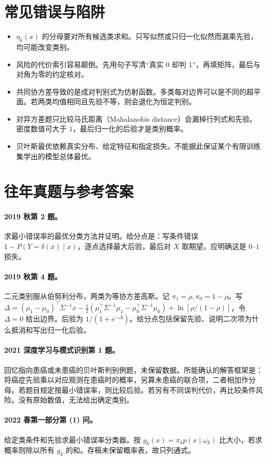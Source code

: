 \documentclass[UTF8,a4paper,zihao=-4,fontset=fandol]{ctexrep}
\begin{document}
\section{常见错误与陷阱}
\begin{itemize}
\item $\eta_k(x)$ 的分母要对所有候选类求和。只写似然或只归一化似然而漏乘先验，均可能改变类别。
\item 风险的代价索引容易颠倒。先用句子写清“真实 0 却判 1”，再填矩阵，最后与对角为零的约定核对。
\item 共同协方差导致的是成对判别式为仿射函数。多类每对边界可以是不同的超平面。若两类均值相同且先验不等，则会退化为恒定判别。
\item 对异方差题只比较马氏距离（Mahalanobis distance）会漏掉行列式和先验。密度数值可大于 1，最后归一化的后验才是类别概率。
\item 贝叶斯最优依赖真实分布、给定特征和指定损失。不能据此保证某个有限训练集学出的模型总体最优。
\end{itemize}

\section{往年真题与参考答案}
\paragraph{2019 秋第 2 题。} 求最小错误率的最优分类方法并证明。给分点是：写条件错误 $1-P(Y=\delta(x)\mid x)$，逐点选择最大后验，最后对 $X$ 取期望。应明确这是 $0$--$1$ 损失。
\paragraph{2019 秋第 4 题。} 二元类别服从伯努利分布，两类为等协方差高斯。记 $\pi_1=\rho,\pi_0=1-\rho$。写 $\Delta=(\mu_1-\mu_0)^\top\Sigma^{-1}x-\frac12(\mu_1^\top\Sigma^{-1}\mu_1-\mu_0^\top\Sigma^{-1}\mu_0)+\ln[\rho/(1-\rho)]$，令 $\Delta=0$ 给出边界。后验为 $1/(1+e^{-\Delta})$。给分点包括保留先验、说明二次项为什么抵消和写出归一化后验。
\paragraph{2021 深度学习与模式识别第 1 题。} 回忆指向患癌或未患癌的贝叶斯判别例题，未保留数据。所能确认的解答框架是：将癌症先验乘以对应观测在患癌时的概率，另算未患癌的联合项，二者相加作分母。若题目规定按最小错误率，则比较后验。若另有不同误判代价，再比较条件风险。没有原始数值，无法给出确定类别。
\paragraph{2022 春第一部分第 (1) 问。} 给定类条件和先验求最小错误率分类器。按 $g_k(x)=\pi_kp(x\mid\omega_k)$ 比大小，若求概率则除以所有 $g_k$ 的和。存稿未保留概率表，故只列通式。
\end{document}

